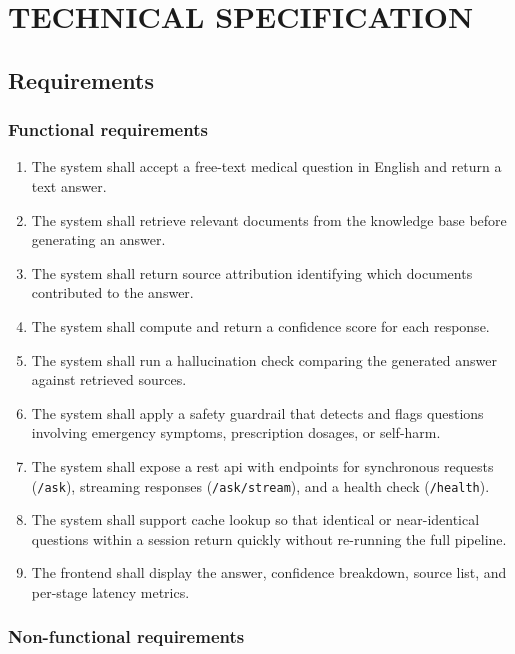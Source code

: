 \chapter{\MakeUppercase{Technical Specification}}

\section{Requirements}

\subsection{Functional requirements}

\begin{enumerate}
    \item The system shall accept a free-text medical question in English and return a text answer.
    \item The system shall retrieve relevant documents from the knowledge base before generating an answer.
    \item The system shall return source attribution identifying which documents contributed to the answer.
    \item The system shall compute and return a confidence score for each response.
    \item The system shall run a hallucination check comparing the generated answer against retrieved sources.
    \item The system shall apply a safety guardrail that detects and flags questions involving emergency symptoms, prescription dosages, or self-harm.
    \item The system shall expose a \ac{rest} \ac{api} with endpoints for synchronous requests (\texttt{/ask}), streaming responses (\texttt{/ask/stream}), and a health check (\texttt{/health}).
    \item The system shall support cache lookup so that identical or near-identical questions within a session return quickly without re-running the full pipeline.
    \item The frontend shall display the answer, confidence breakdown, source list, and per-stage latency metrics.
\end{enumerate}

\subsection{Non-functional requirements}

